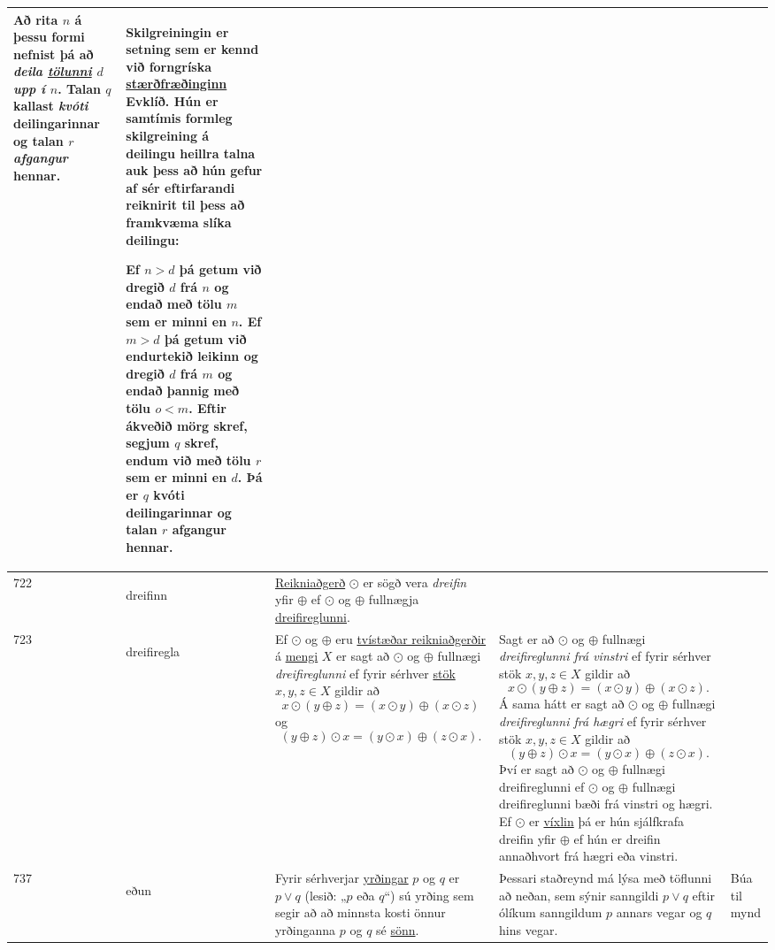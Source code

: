 \begin{longtable}{p{} | p{} | p{} | p{} | p{}}
Að rita \(n\) á þessu formi nefnist þá að \textit{deila \hyperlink{row:5397}{tölunni} \(d\) upp í \(n\)}. Talan \(q\) kallast \textit{kvóti} deilingarinnar og talan
\(r\) \textit{afgangur} hennar. & Skilgreiningin er setning sem er kennd við forngríska \hyperlink{row:5117}{stærðfræðinginn} Evklíð. Hún er samtímis formleg skilgreining á deilingu heillra talna auk þess að hún gefur af sér eftirfarandi reiknirit til þess að framkvæma slíka deilingu: 

Ef \(n > d\) þá getum við dregið \(d\) frá \(n\) og endað með tölu \(m\) sem er minni en \(n\). Ef \(m>d\) þá getum við endurtekið leikinn og dregið \(d\) frá \(m\) og endað þannig með tölu \(o<m\). Eftir ákveðið mörg skref, segjum \(q\) skref, endum við með tölu \(r\) sem er minni en \(d\). Þá er \(q\) kvóti deilingarinnar og talan \(r\) afgangur hennar. &  \\
\hline
722 & \hypertarget{row:722}{dreifinn} & \hyperlink{row:46}{Reikniaðgerð} \(\odot\) er sögð vera \textit{dreifin} yfir \(\oplus\) ef \(\odot\) og \(\oplus\) fullnægja \hyperlink{row:723}{dreifireglunni}. &  &  \\
\hline
723 & \hypertarget{row:723}{dreifiregla} & Ef \(\odot\) og \(\oplus\) eru \hyperlink{row:5702}{tvístæðar reikniaðgerðir} á \hyperlink{row:}{mengi} \(X\) er sagt að \(\odot\) og \(\oplus\) fullnægi \textit{dreifireglunni} ef fyrir sérhver \hyperlink{row:5128}{stök} \(x, y, z \in X\) gildir að \[ x \odot (y \oplus z) = (x \odot y) \oplus (x \odot z) \] og \[ (y \oplus z) \odot x = (y \odot x) \oplus (z \odot x) .\] & Sagt er að \(\odot\) og \(\oplus\) fullnægi \textit{dreifireglunni frá vinstri} ef fyrir sérhver stök \(x, y, z \in X\) gildir að \[ x \odot (y \oplus z) = (x \odot y) \oplus (x \odot z). \] Á sama hátt er sagt að \(\odot\) og \(\oplus\) fullnægi \textit{dreifireglunni frá hægri} ef fyrir sérhver stök \(x, y, z \in X\) gildir að \[ (y \oplus z) \odot x = (y \odot x) \oplus (z \odot x). \] Því er sagt að \(\odot\) og \(\oplus\) fullnægi dreifireglunni ef \(\odot\) og \(\oplus\) fullnægi dreifireglunni bæði frá vinstri og hægri. Ef \(\odot\) er \hyperlink{row:6228}{víxlin} þá er hún sjálfkrafa dreifin yfir \(\oplus\) ef hún er dreifin annaðhvort frá hægri eða vinstri. &  \\
\hline
737 & \hypertarget{row:737}{eðun} & Fyrir sérhverjar \hyperlink{row:1515}{yrðingar} \(p\) og \(q\) er \(p \vee q\) (lesið: „\(p\) eða \(q\)“) sú yrðing sem segir að að minnsta kosti önnur yrðinganna \(p\) og \(q\) sé \hyperlink{row:4565}{sönn}. & Þessari staðreynd má lýsa með töflunni að neðan, sem sýnir sanngildi \(p \vee q\) eftir ólíkum sanngildum \(p\) annars vegar og \(q\) hins vegar. & Búa til mynd \\

\end{longtable}
